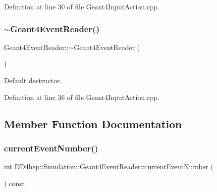 Definition at line 30 of file Geant4\+Input\+Action.\+cpp.

\hypertarget{class_d_d4hep_1_1_simulation_1_1_geant4_event_reader_a79666927f8c31df30ceb03ea5f1c7b12}{}\label{class_d_d4hep_1_1_simulation_1_1_geant4_event_reader_a79666927f8c31df30ceb03ea5f1c7b12} 
\subsubsection{\texorpdfstring{$\sim$\+Geant4\+Event\+Reader()}{~Geant4EventReader()}}
{\footnotesize\ttfamily Geant4\+Event\+Reader\+::$\sim$\+Geant4\+Event\+Reader (\begin{DoxyParamCaption}{ }\end{DoxyParamCaption})\hspace{0.3cm}{\ttfamily [virtual]}}



Default destructor. 



Definition at line 36 of file Geant4\+Input\+Action.\+cpp.



\subsection{Member Function Documentation}
\hypertarget{class_d_d4hep_1_1_simulation_1_1_geant4_event_reader_af16b54da1320a845c23c1a329582565f}{}\label{class_d_d4hep_1_1_simulation_1_1_geant4_event_reader_af16b54da1320a845c23c1a329582565f} 
\subsubsection{\texorpdfstring{current\+Event\+Number()}{currentEventNumber()}}
{\footnotesize\ttfamily int D\+D4hep\+::\+Simulation\+::\+Geant4\+Event\+Reader\+::current\+Event\+Number (\begin{DoxyParamCaption}{ }\end{DoxyParamCaption}) const\hspace{0.3cm}{\ttfamily [inline]}}




